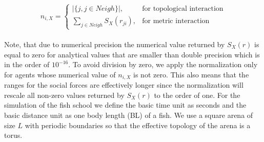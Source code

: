 \documentclass[a4paper,10pt,hidelinks]{scrreprt}
\begin{document}
	\begin{equation}
	n_{i,X} = \left\{\begin{array}{lc}
	|\{j, j \in Neigh\}|, & \text{for topological interaction}\\
	\sum_{j \in Neigh} S_X(r_{ji}), & \text{for metric interaction}
	\end{array}\right.
	\label{eq:neigh}
	\end{equation}\\
	Note, that due to numerical precision the numerical value returned by $S_X(r)$ is equal to zero for analytical values that are smaller than double precision which is in the order of $10^{-16}$.
	To avoid division by zero, we apply the normalization only for agents whose numerical value of $n_{i,X}$ is not zero.
	This also means that the ranges for the social forces are effectively longer since the normalization will rescale all non-zero values returned by $S_X(r)$ to the order of one.
	For the simulation of the fish school we define the basic time unit as seconds and the basic distance unit as one body length (BL) of a fish.
	We use a square arena of size $L$ with periodic boundaries so that the effective topology of the arena is a torus.
\end{document}
